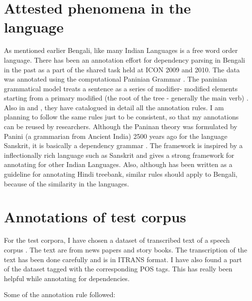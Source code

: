 \documentclass[11pt,letterpaper]{article}
\begin{document}
\section{Attested phenomena in the language}
As mentioned earlier Bengali, like many Indian Languages is a free word order language. There has been an annotation effort for dependency parsing in Bengali in the past as a part of the shared task held at ICON 2009 and 2010. The data was annotated using the computational Paninian Grammar \citep{Bharati}. The paninian grammatical model treats a sentence as a series of modifier- modified elements starting from a primary modified (the root of the tree - generally the main verb) \citep{Bharati-2009}. Also in \citep{Bharati-2009} and \citep{Begum-2008}, they have catalogued in detail all the annotation rules. I am planning to follow the same rules just to be consistent, so that my annotations can be reused by researchers. Although the Paninan theory was formulated by Panini (a grammarian from Ancient India) 2500 years ago for the language Sanskrit, it is basically a dependency grammar \citep{Kiparsky, Shastri}. The framework is inspired by a inflectionally rich language such as Sanskrit and gives a strong framework for annotating for other Indian Languages. Also, although \citep{Bharati-2009} has been written as a guideline for annotating Hindi treebank, similar rules should apply to Bengali, because of the similarity in the languages.

\section{Annotations of test corpus}
For the test corpora, I have chosen a dataset of transcribed text of a speech corpus \citep{Shruti}. The text are from news papers and story books. The transcription of the text has been done carefully and is in ITRANS format. I have also found a part of the dataset tagged with the corresponding POS tags. This has really been helpful while annotating for dependencies.

Some of the annotation rule followed:
\end{document}
